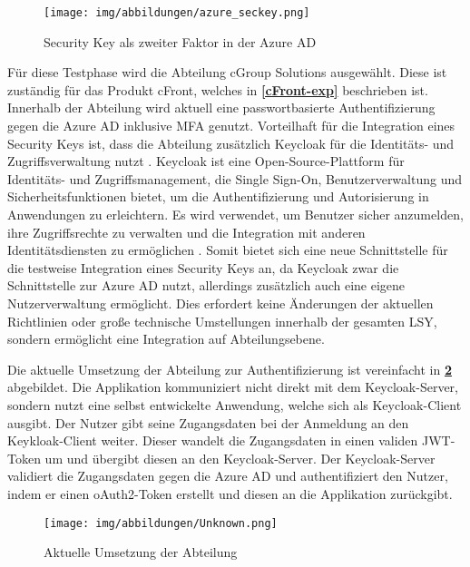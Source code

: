\begin{figure}[h]
	\centering 
	\texttt{[image: img/abbildungen/azure\_seckey.png]}
	\captionsetup{format=hang}
	\caption{Security Key als zweiter Faktor in der Azure \ac{AD}} \label{azure-seckey}
\end{figure}

Für diese Testphase wird die Abteilung cGroup Solutions ausgewählt. Diese ist zuständig für das Produkt cFront, welches in \textbf{\ref{cFront-exp}} beschrieben ist. Innerhalb der Abteilung wird aktuell eine passwortbasierte Authentifizierung gegen die Azure \ac{AD} inklusive \ac{MFA} genutzt. Vorteilhaft für die Integration eines Security Keys ist, dass die Abteilung zusätzlich Keycloak für die Identitäts- und Zugriffsverwaltung nutzt \cite{keycloak}. Keycloak ist eine Open-Source-Plattform für Identitäts- und Zugriffsmanagement, die Single Sign-On, Benutzerverwaltung und Sicherheitsfunktionen bietet, um die Authentifizierung und Autorisierung in Anwendungen zu erleichtern. Es wird verwendet, um Benutzer sicher anzumelden, ihre Zugriffsrechte zu verwalten und die Integration mit anderen Identitätsdiensten zu ermöglichen \cite{keycloak}. Somit bietet sich eine neue Schnittstelle für die testweise Integration eines Security Keys an, da Keycloak zwar die Schnittstelle zur Azure \ac{AD} nutzt, allerdings zusätzlich auch eine eigene Nutzerverwaltung ermöglicht. Dies erfordert keine Änderungen der aktuellen Richtlinien oder große technische Umstellungen innerhalb der gesamten \ac{LSY}, sondern ermöglicht eine Integration auf Abteilungsebene.

Die aktuelle Umsetzung der Abteilung zur Authentifizierung ist vereinfacht in \textbf{\ref{current-imp}} abgebildet. Die Applikation kommuniziert nicht direkt mit dem Keycloak-Server, sondern nutzt eine selbst entwickelte Anwendung, welche sich als Keycloak-Client ausgibt. Der Nutzer gibt seine Zugangsdaten bei der Anmeldung an den Keykloak-Client weiter. Dieser wandelt die Zugangsdaten in einen validen JWT-Token um und übergibt diesen an den Keycloak-Server. Der Keycloak-Server validiert die Zugangsdaten gegen die Azure \ac{AD} und authentifiziert den Nutzer, indem er einen oAuth2-Token erstellt und diesen an die Applikation zurückgibt.


\begin{figure}[h]
	\centering 
	\texttt{[image: img/abbildungen/Unknown.png]}
	\captionsetup{format=hang}
	\caption{Aktuelle Umsetzung der Abteilung} \label{current-imp}
\end{figure}

